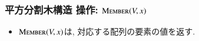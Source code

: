 \documentclass[main]{subfiles}
\begin{document}
\begin{frame}\frametitle{平方分割木構造 操作: $\mathrm{\text{M\textsc{ember}}}(V,x)$}
\begin{itemize}
\item $\mathrm{\text{M\textsc{ember}}}(V,x)$は, 対応する配列の要素の値を返す.
\end{itemize}
 

\end{frame}
\end{document}
